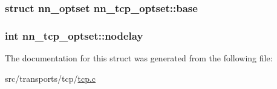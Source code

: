 \subsubsection[{base}]{\setlength{\rightskip}{0pt plus 5cm}struct {\bf nn\+\_\+optset} nn\+\_\+tcp\+\_\+optset\+::base}\hypertarget{structnn__tcp__optset_adc310c531e0e75b90710658ac2db646d}{}\label{structnn__tcp__optset_adc310c531e0e75b90710658ac2db646d}
\subsubsection[{nodelay}]{\setlength{\rightskip}{0pt plus 5cm}int nn\+\_\+tcp\+\_\+optset\+::nodelay}\hypertarget{structnn__tcp__optset_aba86c4b054d9bf1aa0d17d97d6a9c764}{}\label{structnn__tcp__optset_aba86c4b054d9bf1aa0d17d97d6a9c764}


The documentation for this struct was generated from the following file\+:\begin{DoxyCompactItemize}
\item 
src/transports/tcp/\hyperlink{src_2transports_2tcp_2tcp_8c}{tcp.\+c}\end{DoxyCompactItemize}
